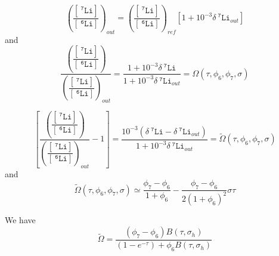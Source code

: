 \documentclass[aps,onecolumn,11pt]{revtex4}
\newcommand{\mychem}[1]{\mathtt{#1}}
\newcommand{\myconc}[1]{\left\lbrack{#1}\right\rbrack}
\newcommand{\spLi}[1]{{~^{\mychem{#1}}\mychem{Li}}}
\newcommand{\Li}[1]{\myconc{\spLi{#1}}}
\newcommand{\ratioLi}{ {\left(\dfrac{\Li{7}}{\Li{6}}\right)} }
\newcommand{\deltaLi}{ {\delta\!\!\spLi{7}} }
\begin{document}
\begin{equation}
	\ratioLi_{out} = \ratioLi_{ref} \left[ 1 + 10^{-3}  \deltaLi_{out} \right]
\end{equation}
and
\begin{equation}
\boxed{
	\dfrac{\ratioLi}{\ratioLi_{out}} = \dfrac{1+10^{-3}\deltaLi}{1+10^{-3}\deltaLi_{out}} = \Omega\left(\tau,\phi_6,\phi_7,\sigma\right)
	}
\end{equation}

\begin{equation}
{
	\left\lbrack\dfrac{\ratioLi}{\ratioLi_{out}} - 1 \right\rbrack =
	 \dfrac{10^{-3}\left(\deltaLi-\deltaLi_{out}\right)}{1+10^{-3}\deltaLi_{out}} = \tilde\Omega\left(\tau,\phi_6,\phi_7,\sigma\right)
}
\end{equation}
and
\begin{equation}
	\tilde\Omega\left(\tau,\phi_6,\phi_7,\sigma\right) \simeq \dfrac{\phi_7-\phi_6}{1+\phi_6} - \dfrac{\phi_7-\phi_6}{2\left(1+\phi_6\right)^2} \sigma \tau
\end{equation}

We have
\begin{equation}
	\tilde\Omega = \dfrac{\left(\phi_7-\phi_6\right)B\left(\tau,\sigma_h\right)}{\left(1-e^{ -\tau }\right) + \phi_6 B\left(\tau,\sigma_h\right)}
\end{equation}	
\end{document}
